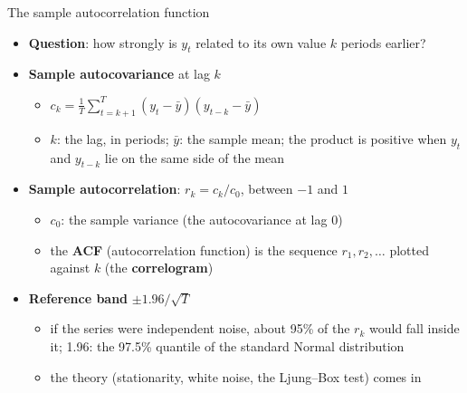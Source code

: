 \begin{frame}{The sample autocorrelation function}
\itemsize{\small}
\begin{itemize}
    \item \textbf{Question}: how strongly is $y_t$ related to its own value $k$ periods earlier?
    \item \textbf{Sample autocovariance} at lag $k$
    \begin{itemize}
        \item $c_k = \frac{1}{T} \sum_{t=k+1}^{T} (y_t - \bar y)(y_{t-k} - \bar y)$
        \item $k$: the lag, in periods; $\bar y$: the sample mean; the product is positive when $y_t$ and $y_{t-k}$ lie on the same side of the mean
    \end{itemize}
    \item \textbf{Sample autocorrelation}: $r_k = c_k / c_0$, between $-1$ and $1$
    \begin{itemize}
        \item $c_0$: the sample variance (the autocovariance at lag 0)
        \item the \textbf{ACF} (autocorrelation function) is the sequence $r_1, r_2, \ldots$ plotted against $k$ (the \textbf{correlogram})
    \end{itemize}
    \item \textbf{Reference band} $\pm 1.96 / \sqrt{T}$
    \begin{itemize}
        \item if the series were independent noise, about 95\% of the $r_k$ would fall inside it; 1.96: the 97.5\% quantile of the standard Normal distribution
        \item the theory (stationarity, white noise, the Ljung--Box test) comes in 
    \end{itemize}
\end{itemize}
\end{frame}

